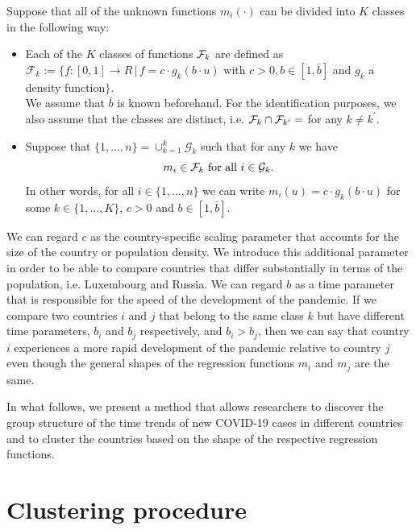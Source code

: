 \documentclass[a4paper,11pt]{article}
\numberwithin{equation}{section}
\begin{document}
Suppose that all of the unknown functions $m_i(\cdot)$ can be divided into $K$ classes in the following way:
\begin{itemize}
	\item Each of the $K$ classes of functions $\mathcal{F}_k$ are defined as\\
	 $\mathcal{F}_k := \{ f:[0, 1] \rightarrow R \,|\, f = c \cdot g_k(b \cdot u)$ with $c>0, b\in [1, \bar{b}]$ and $g_k$ a density function$\}$.\\
	 We assume that $\bar{b}$ is known beforehand. For the identification purposes, we also assume that the classes are distinct, i.e. $\class_k \cap \class_{k^\prime} = \empty$ for any $k \neq k^\prime$. 
	 \item Suppose that $\{1, \ldots, n\} = \cup_{k=1}^k \mathcal{G}_k$ such that for any $k$ we have
	 \vspace{-2mm}
	 $$m_i \in \mathcal{F}_k \text{ for all } i \in \mathcal{G}_k.$$
	In other words, for all $i \in \{1, \ldots, n\}$ we can write $m_i(u) = c \cdot g_k (b \cdot u)$ for some $k \in \{1, \ldots, K\}$, $c > 0 $ and $b \in [1, \bar{b}]$.
\end{itemize} 

We can regard $c$ as the country-specific scaling parameter that accounts for the size of the country or population density. We introduce this additional parameter in order to be able to compare countries that differ substantially in terms of the population, i.e. Luxembourg and Russia. We can regard $b$ as a time parameter that is responsible for the speed of the development of the pandemic. If we compare two countries $i$ and $j$  that belong to the same class $k$ but have different time parameters, $b_i$ and $b_j$ respectively, and $b_i > b_j$, then we can say that country $i$ experiences a more rapid development of the pandemic relative to country $j$ even though the general shapes of the regression functions $m_i$ and $m_j$ are the same.

In what follows, we present a method that allows researchers to discover the group structure of the time trends of new COVID-19 cases in different countries and to cluster the countries based on the shape of the respective regression functions.


\section{Clustering procedure}
\end{document}
